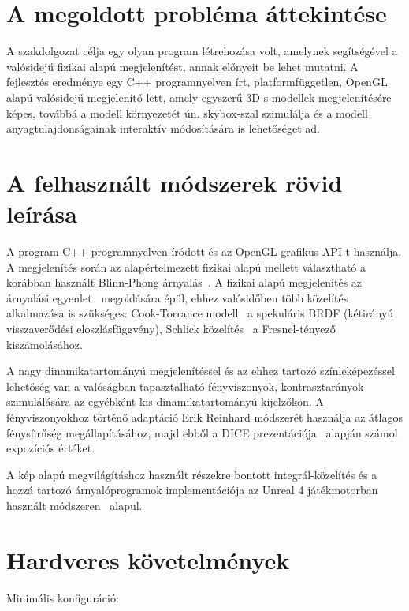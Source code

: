 
\section{A megoldott probléma áttekintése}

A szakdolgozat célja egy olyan program létrehozása volt, amelynek segítségével a valósidejű fizikai alapú megjelenítést, annak előnyeit be lehet mutatni. A fejlesztés eredménye egy C++ programnyelven írt, platformfüggetlen, OpenGL alapú valósidejű megjelenítő lett, amely egyszerű 3D-s modellek megjelenítésére képes, továbbá a modell környezetét ún. skybox-szal szimulálja és a modell anyagtulajdonságainak interaktív módosítására is lehetőséget ad.

\section{A felhasznált módszerek rövid leírása}

A program C++ programnyelven íródott és az OpenGL grafikus API-t használja. A megjelenítés során az alapértelmezett fizikai alapú mellett választható a korábban használt Blinn-Phong árnyalás~\cite{blinn1977models}. A fizikai alapú megjelenítés az árnyalási egyenlet~\cite{immel1986radiosity} megoldására épül, ehhez valósidőben több közelítés alkalmazása is szükséges: Cook-Torrance modell~\cite{cook1981reflectance} a spekuláris BRDF (kétirányú visszaverődési eloszlásfüggvény), Schlick közelítés~\cite{schlick1994inexpensive} a Fresnel-tényező kiszámolásához.

A nagy dinamikatartományú megjelenítéssel és az ehhez tartozó színleképezéssel lehetőség van a valóságban tapasztalható fényviszonyok, kontrasztarányok szimulálására az egyébként kis dinamikatartományú kijelzőkön. A fényviszonyokhoz történő adaptáció Erik Reinhard\cite{reinhard2002photographic} módszerét használja az átlagos fénysűrűség megállapításához, majd ebből a DICE prezentációja~\cite{dice_moving_frostbite_to_pbr} alapján számol expozíciós értéket.

A kép alapú megvilágításhoz használt részekre bontott integrál-közelítés és a hozzá tartozó árnyalóprogramok implementációja az Unreal 4 játékmotorban használt módszeren~\cite{karis2013real} alapul.

\section{Hardveres követelmények}

Minimális konfiguráció:

